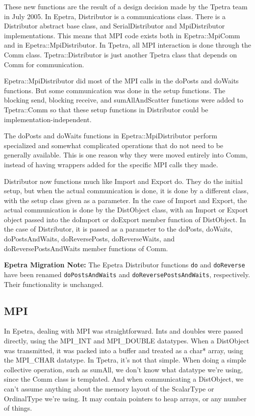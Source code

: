 \documentclass[10pt,relax]{TpetraDesign}
\begin{document}
These new functions are the result of a design decision made by the Tpetra team in July 2005. In Epetra, Distributor is a communications class. There is a Distributor abstract base class, and SerialDistributor and MpiDistributor implementations. This means that MPI code exists both in Epetra::MpiComm and in Epetra::MpiDistributor. In Tpetra, all MPI interaction is done through the Comm class. Tpetra::Distributor is just another Tpetra class that depends on Comm for communication.

Epetra::MpiDistributor did most of the MPI calls in the doPosts and doWaits functions. But some communication was done in the setup functions. The blocking send, blocking receive, and sumAllAndScatter functions were added to Tpetra::Comm so that these setup functions in Distributor could be implementation-independent. 

The doPosts and doWaits functions in Epetra::MpiDistributor perform specialized and somewhat complicated operations that do not need to be generally available. This is one reason why they were moved entirely into Comm, instead of having wrappers added for the specific MPI calls they made. 

Distributor now functions much like Import and Export do. They do the initial setup, but when the actual communication is done, it is done by a different class, with the setup class given as a parameter. In the case of Import and Export, the actual communication is done by the DistObject class, with an Import or Export object passed into the doImport or doExport member function of DistObject. In the case of Distributor, it is passed as a parameter to the doPosts, doWaits, doPostsAndWaits, doReversePosts, doReverseWaits, and doReversePostsAndWaits member functions of Comm.

\textbf{Epetra Migration Note:} The Epetra Distributor functions \texttt{do} and \texttt{doReverse} have been renamed \texttt{doPostsAndWaits} and \texttt{doReversePostsAndWaits}, respectively. Their functionality is unchanged.

%
\subsection{MPI}
In Epetra, dealing with MPI was straightforward. Ints and doubles were passed directly, using the MPI\_INT and MPI\_DOUBLE datatypes. When a DistObject was transmitted, it was packed into a buffer and treated as a char* array, using the MPI\_CHAR datatype. In Tpetra, it's not that simple. When doing a simple collective operation, such as sumAll, we don't know what datatype we're using, since the Comm class is templated. And when communicating a DistObject, we can't assume anything about the memory layout of the ScalarType or OrdinalType we're using. It may contain pointers to heap arrays, or any number of things.
\end{document}
